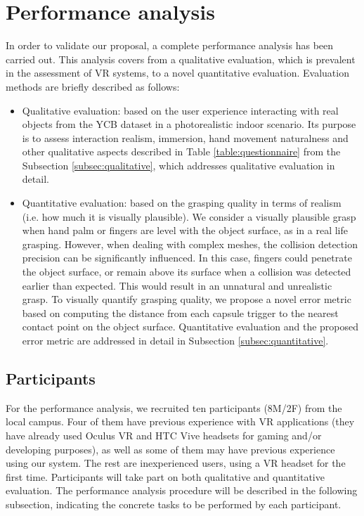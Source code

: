 \section{Performance analysis}
\label{sec:experimentation}

In order to validate our proposal, a complete performance analysis has been carried out. This analysis covers from a qualitative evaluation, which is prevalent in the assessment of VR systems, to a novel quantitative evaluation. Evaluation methods are briefly described as follows:
\begin{itemize}
	\item Qualitative evaluation: based on the user experience interacting with real objects from the YCB dataset in a photorealistic indoor scenario. Its purpose is to assess interaction realism, immersion, hand movement naturalness and other qualitative aspects described in Table \ref{table:questionnaire} from the Subsection \ref{subsec:qualitative}, which addresses qualitative evaluation in detail.
	\item Quantitative evaluation: based on the grasping quality in terms of realism (i.e. how much it is visually plausible). We consider a visually plausible grasp when hand palm or fingers are level with the object surface, as in a real life grasping. However, when dealing with complex meshes, the collision detection precision can be significantly influenced. In this case, fingers could penetrate the object surface, or remain above its surface when a collision was detected earlier than expected. This would result in an unnatural and unrealistic grasp. To visually quantify grasping quality, we propose a novel error metric based on computing the distance from each capsule trigger to the nearest contact point on the object surface. Quantitative evaluation and the proposed error metric are addressed in detail in Subsection \ref{subsec:quantitative}.
	
\end{itemize}


\subsection{Participants}

For the performance analysis, we recruited ten participants (8M/2F) from the local campus. Four of them have previous experience with VR applications (they have already used Oculus VR and HTC Vive headsets for gaming and/or developing purposes), as well as some of them may have previous experience using our system. The rest are inexperienced users, using a VR headset for the first time. Participants will take part on both qualitative and quantitative evaluation. The performance analysis procedure will be described in the following subsection, indicating the concrete tasks to be performed by each participant.

